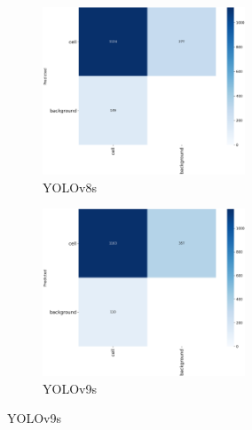 \documentclass[12pt,a4paper,onecolumn,oneside]{report}
\begin{document}
\begin{figure}[H]
  \centering
  \vspace{-0.3cm}
  \begin{subfigure}[b]{0.45\textwidth}
    \centering
    \includegraphics[height=5cm]{figuras/resultados experimentacion/yolov8s/original_test/confusion_matrix.png}
    \vspace{-0.3cm}
    \caption{\footnotesize YOLOv8s}
    \label{fig:confusion_yolov8s_original_test}
  \end{subfigure}
  \hfill
  \begin{subfigure}[b]{0.45\textwidth}
    \centering
    \includegraphics[height=5cm]{figuras/resultados experimentacion/yolov9s/original_test/confusion_matrix.png}
    \vspace{-0.3cm}
    \caption{\footnotesize YOLOv9s}
    \label{fig:confusion_yolov9s_original_test}
  \end{subfigure}
  

\end{figure}
\end{document}
